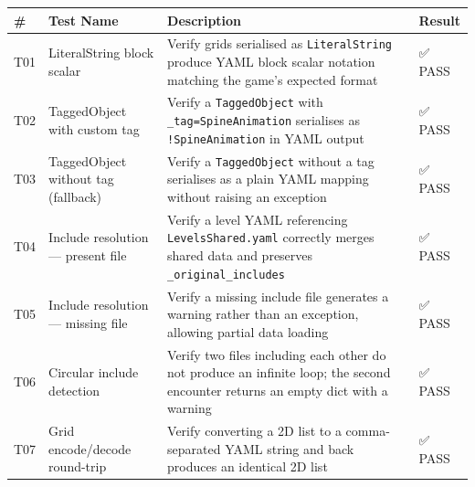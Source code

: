 \begin{longtable}[]{@{}
  >{\raggedright\arraybackslash}p{}
  >{\raggedright\arraybackslash}p{}
  >{\raggedright\arraybackslash}p{}
  >{\raggedright\arraybackslash}p{}@{}}
\toprule\noalign{}
\begin{minipage}[b]{\linewidth}\raggedright
\#
\end{minipage} & \begin{minipage}[b]{\linewidth}\raggedright
Test Name
\end{minipage} & \begin{minipage}[b]{\linewidth}\raggedright
Description
\end{minipage} & \begin{minipage}[b]{\linewidth}\raggedright
Result
\end{minipage} \\
\midrule\noalign{}
\endhead
\bottomrule\noalign{}
\endlastfoot
T01 & LiteralString block scalar & Verify grids serialised as
\texttt{LiteralString} produce YAML \texttt{\textbar{}} block scalar
notation matching the game's expected format & ✅ PASS \\
T02 & TaggedObject with custom tag & Verify a \texttt{TaggedObject} with
\texttt{\_tag=\textquotesingle{}SpineAnimation\textquotesingle{}}
serialises as \texttt{!SpineAnimation} in YAML output & ✅ PASS \\
T03 & TaggedObject without tag (fallback) & Verify a
\texttt{TaggedObject} without a tag serialises as a plain YAML mapping
without raising an exception & ✅ PASS \\
T04 & Include resolution --- present file & Verify a level YAML
referencing \texttt{LevelsShared.yaml} correctly merges shared data and
preserves \texttt{\_original\_includes} & ✅ PASS \\
T05 & Include resolution --- missing file & Verify a missing include
file generates a warning rather than an exception, allowing partial data
loading & ✅ PASS \\
T06 & Circular include detection & Verify two files including each other
do not produce an infinite loop; the second encounter returns an empty
dict with a warning & ✅ PASS \\
T07 & Grid encode/decode round-trip & Verify converting a 2D list to a
comma-separated YAML string and back produces an identical 2D list & ✅
PASS \\

\end{longtable}
